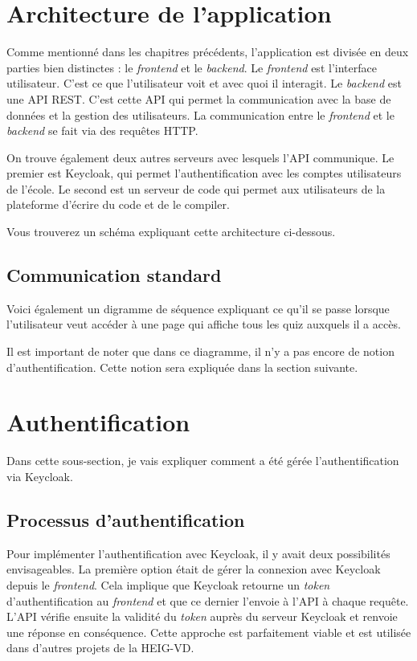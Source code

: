 \section{Architecture de l'application}
Comme mentionné dans les chapitres précédents, l'application est divisée en deux parties bien distinctes : le \emph{frontend} et le \emph{backend}. Le \emph{frontend} est l'interface utilisateur. C'est ce que l'utilisateur voit et avec quoi il interagit. Le \emph{backend} est une API REST. C'est cette API qui permet la communication avec la base de données et la gestion des utilisateurs. La communication entre le \emph{frontend} et le \emph{backend} se fait via des requêtes HTTP.

On trouve également deux autres serveurs avec lesquels l'API communique. Le premier est Keycloak, qui permet l'authentification avec les comptes utilisateurs de l'école. Le second est un serveur de code qui permet aux utilisateurs de la plateforme d'écrire du code et de le compiler.

Vous trouverez un schéma expliquant cette architecture ci-dessous.


\subsection{Communication standard}

Voici également un digramme de séquence expliquant ce qu'il se passe lorsque l'utilisateur veut accéder à une page qui affiche tous les quiz auxquels il a accès.


Il est important de noter que dans ce diagramme, il n'y a pas encore de notion d'authentification. Cette notion sera expliquée dans la section suivante.

\section{Authentification}
Dans cette sous-section, je vais expliquer comment a été gérée l'authentification via Keycloak.

\subsection{Processus d'authentification}
Pour implémenter l'authentification avec Keycloak, il y avait deux possibilités envisageables. La première option était de gérer la connexion avec Keycloak depuis le \emph{frontend}. Cela implique que Keycloak retourne un \emph{token} d'authentification au \emph{frontend} et que ce dernier l'envoie à l'API à chaque requête. L'API vérifie ensuite la validité du \emph{token} auprès du serveur Keycloak et renvoie une réponse en conséquence. Cette approche est parfaitement viable et est utilisée dans d'autres projets de la HEIG-VD.

